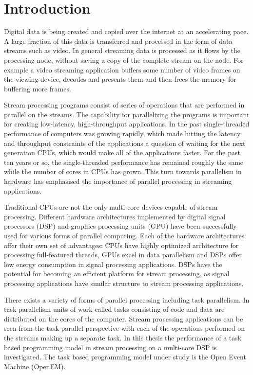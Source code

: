 \chapter{Introduction}
\label{chapter:introduction}
Digital data is being created and copied over the internet at an accelerating pace. A large fraction of this data is transferred and processed in the form of data streams such as video. In general streaming data is processed as it flows by the processing node, without saving a copy of the complete stream on the node. For example a video streaming application buffers some number of video frames on the viewing device, decodes and presents them and then frees the memory for buffering more frames.

Stream processing programs consist of series of operations that are performed in parallel on the streams. The capability for parallelizing the programs is important for creating low-latency, high-throughput applications. In the past single-threaded performance of computers was growing rapidly, which made hitting the latency and throughput constraints of the applications a question of waiting for the next generation CPUs, which would make all of the applications faster. For the past ten years or so, the single-threaded performance has remained roughly the same while the number of cores in CPUs has grown. This turn towards parallelism in hardware has emphasised the importance of parallel processing in streaming applications.

Traditional CPUs are not the only multi-core devices capable of stream processing. Different hardware architectures implemented by digital signal processors (DSP) and graphics processing units (GPU) have been successfully used for various forms of parallel computing. Each of the hardware architectures offer their own set of advantages: CPUs have highly optimized architecture for processing full-featured threads, GPUs excel in data parallelism and DSPs offer low energy consumption in signal processing applications. DSPs have the potential for becoming an efficient platform for stream processing, as signal processing applications have similar structure to stream processing applications.

There exists a variety of forms of parallel processing including task parallelism. In task parallelism units of work called tasks consisting of code and data are distributed on the cores of the computer. Stream processing applications can be seen from the task parallel perspective with each of the operations performed on the streams making up a separate task. In this thesis the performance of a task based programming model in stream processing on a multi-core DSP is investigated. The task based programming model under study is the Open Event Machine (OpenEM).

